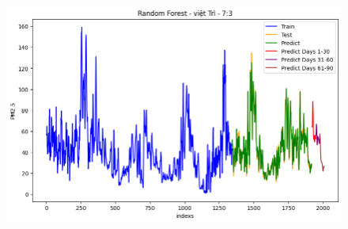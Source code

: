 \begin{figure}[H]
\begin{minipage}{0.15\textwidth}
    \includegraphics[width=1\textwidth]{img/final/RF/90D/RF_7_3_VT.png}
    \end{minipage}
    \hfill


\end{figure}
